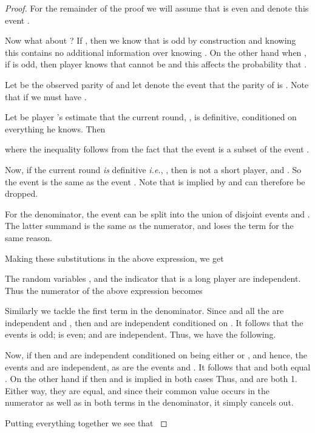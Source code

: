 \documentclass[12pt]{article}
\theoremstyle{definition}
\newcommand{\ie}{\emph{i.e.}}
\begin{document}
\begin{proof}
\newcommand{\EEE}{\mathcal{E}_t}
\newcommand{\EEEE}{\mathcal{E}^{b}_{t+1}}

For the remainder of the proof we will assume that  is even
and denote this event .


Now what about ? If , then we know that  
is odd by construction and knowing this contains no additional information 
over knowing . On the other hand when , if  
is odd, then player  knows that  cannot be  and this affects the 
probability that .

Let  be the observed parity of  and let 
 denote the event that the 
parity of  is . Note that if  we must have 
.


Let  be player 's estimate that the current round, 
, is definitive, conditioned on everything he knows. Then

where the inequality follows from the fact that the event  is a subset of the event .

Now, if the current round \emph{is} definitive \ie, , then  is not 
a short player, and . So the event  is the same as the event .   Note that  is 
implied  by  and can therefore be dropped.

For the denominator, the event  can be split into the union of disjoint events 
 and 
. The latter summand 
is the same as the numerator, and loses the  term for the same reason.

Making these substitutions in the above expression, we get 

The random variables ,  and the indicator that  is a long player
are independent. Thus the numerator of the above expression becomes

Similarly we tackle the first term in the denominator. Since  and all the 
 are independent and , then  and  
are independent conditioned on . It follows that the events 
 is odd;  is even; and  are 
independent.  Thus, we have the following.


Now, if  then  and  are independent conditioned 
on  being either  or , and hence, the events 
 and  are independent, as are the 
events
 and .
It follows that  and 
 both equal .
On the other hand if  then  and  is implied  in both cases
Thus,  and 
 are both 1. Either way, they are 
equal, and since their common value occurs in the numerator as well as in 
both terms in the denominator, it simply cancels out.  

Putting everything together we see that 
{\belowdisplayskip=-14pt
 \qedhere}
\end{proof}
\end{document}
